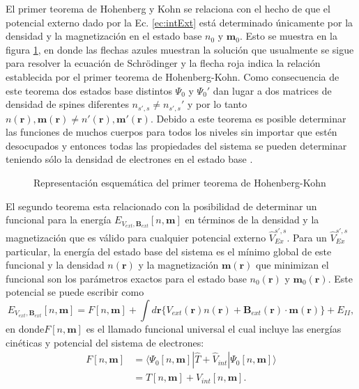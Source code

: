   \par El primer teorema de Hohenberg y Kohn se relaciona con el hecho  de que el potencial externo dado por la Ec. \ref{ec:intExt}  est\'a determinado \'unicamente por la densidad y la magnetizaci\'on en el estado base $n_0$ y $\pmb{m}_0$. Esto se muestra en la figura \ref{fig:hk1},   en donde las flechas azules muestran la soluci\'on que usualmente se sigue para resolver la ecuaci\'on de Schrödinger y la flecha roja indica la relaci\'on establecida por el primer teorema de Hohenberg-Kohn.  Como consecuencia de este teorema dos estados base distintos $\Psi_0 $ y $\Psi_0 '$ dan lugar a dos matrices de densidad de spines diferentes $n_{s',s} \not =n_{s',s}' $ y por lo tanto $n(\pmb{r}), \pmb{m}(\pmb{r}) \not = n'(\pmb{r}), \pmb{m}'(\pmb{r})$. Debido a este teorema es posible determinar las funciones de muchos cuerpos para todos los niveles sin importar que est\'en desocupados y entonces todas las propiedades del sistema se pueden determinar teniendo s\'olo la densidad de electrones en el estado base \cite{HK-1964, PhysRevB.37.10685}.
  \begin{figure}[!hbt]
  	\centering
  	\caption[Primer teorema de Hohenberg-Kohn]{Representaci\'on esquem\'atica del primer teorema de Hohenberg-Kohn}
  	\label{fig:hk1}
  \end{figure}


  \par El segundo teorema esta relacionado con la posibilidad de determinar un funcional para la energ\'ia $E_{V_{ext}, \pmb{B}_{ext}}[n,\pmb{m}]$ en t\'erminos de la densidad y la magnetizaci\'on que es v\'alido para cualquier potencial externo $\hat{V}_{Ex}^{s', s}$. Para un $\hat{V}_{Ex}^{s', s}$ particular, la energ\'ia del estado base del sistema es el m\'inimo global de este funcional y la densidad $n(\pmb{r})$ y la magnetizaci\'on $\pmb{m}(\pmb{r})$ que minimizan el funcional son los par\'ametros exactos para el estado base  $n_0(\pmb{r})$ y $\pmb{m}_0(\pmb{r})$. Este potencial se puede escribir como \cite{PhysRevB.37.10685}
  \begin{equation}
   E_{V_{ext}, \pmb{B}_{ext}}[n,\pmb{m}]= F[n,\pmb{m}] + \int d \pmb{r} \{V_{ext} (\pmb{r}) n(\pmb{r})+\pmb{B}_{ext} (\pmb{r}) \cdot \pmb{m} (\pmb{r}) \} +E_{II}, \label{ec:funcional}
  \end{equation}
  en donde$F[n,\pmb{m}]$ es el llamado funcional universal el cual incluye las energ\'ias cin\'eticas y potencial del sistema de electrones:
  \begin{eqnarray}
  F[n,\pmb{m}]&= \langle \Psi_0 [n,\pmb{m}]| \hat{T}+\hat{V}_{int} | \Psi_0 [n,\pmb{m}] \rangle \nonumber \\
              &= T[n,\pmb{m}] + V_{int} [n,\pmb{m}]. \label{ec:funcF}
  \end{eqnarray}
  
